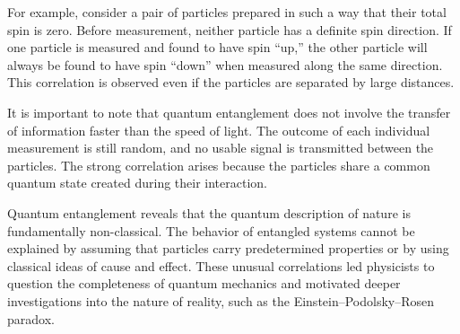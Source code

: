 \documentclass[17pt,a4paper]{extarticle}
\begin{document}
\begin{itemize}
For example, consider a pair of particles prepared in such a way that their total spin is zero. Before measurement, neither particle has a definite spin direction. If one particle is measured and found to have spin “up,” the other particle will always be found to have spin “down” when measured along the same direction. This correlation is observed even if the particles are separated by large distances.

It is important to note that quantum entanglement does not involve the transfer of information faster than the speed of light. The outcome of each individual measurement is still random, and no usable signal is transmitted between the particles. The strong correlation arises because the particles share a common quantum state created during their interaction.

Quantum entanglement reveals that the quantum description of nature is fundamentally non-classical. The behavior of entangled systems cannot be explained by assuming that particles carry predetermined properties or by using classical ideas of cause and effect. These unusual correlations led physicists to question the completeness of quantum mechanics and motivated deeper investigations into the nature of reality, such as the Einstein–Podolsky–Rosen paradox.

\end{itemize}
\end{document}
